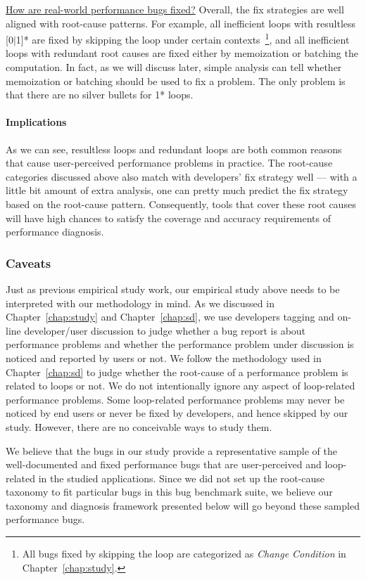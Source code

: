 \underline{How are real-world performance bugs fixed?}
Overall, the fix strategies are well aligned with root-cause patterns.
For example, 
all inefficient loops with resultless [0$|$1]* are
fixed by skipping the loop under certain contexts~\footnote{All bugs fixed by skipping the loop are 
categorized as \emph{Change Condition} in Chapter~\ref{chap:study}.},
and all inefficient loops with redundant root causes are fixed either by 
memoization or batching the computation. 
In fact, as we will discuss later, simple analysis can tell whether 
memoization or batching should be used to fix a problem.
The only problem is that there are no silver bullets for 1* loops.

\paragraph{Implications}
As we can see, resultless loops and redundant loops are both common reasons
that cause user-perceived performance problems in practice. The root-cause
categories discussed above also match with developers' fix strategy well ---
with a little bit amount of extra analysis, one can pretty much predict the fix strategy based on the root-cause pattern.
Consequently, tools that cover these root causes will have high
chances to satisfy the coverage and accuracy requirements of performance 
diagnosis.


\subsubsection{Caveats} 
Just as previous empirical study work, 
our empirical study above needs to be interpreted with our methodology in mind.
As we discussed in Chapter~\ref{chap:study} and Chapter~\ref{chap:sd}, 
we use developers tagging and
on-line developer/user discussion to judge whether a bug report is about
performance problems and whether 
the performance problem under discussion is noticed and reported by users
or not.
We follow the methodology used in Chapter~\ref{chap:sd} to judge 
whether the root-cause of a performance problem is related to loops or not.
We do not intentionally ignore any aspect of loop-related performance problems. 
Some loop-related performance problems may never be noticed by end users
or never be fixed by developers, and hence skipped by our study. However,
there are no conceivable ways to study them. 

We believe that the bugs in our study provide a representative sample of the 
well-documented and
fixed performance bugs that are user-perceived and loop-related in the studied 
applications. 
Since we did not set up the root-cause taxonomy to fit particular
bugs in this bug benchmark suite, we believe our taxonomy and diagnosis
framework presented below will go beyond these sampled performance bugs. 

